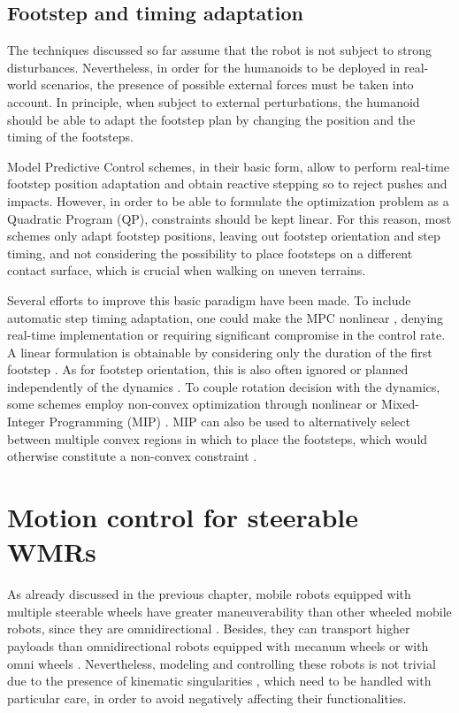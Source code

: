 \subsection{Footstep and timing adaptation}
The techniques discussed so far assume that the robot is not subject to strong 
disturbances. Nevertheless, in order for the humanoids to be deployed in
real-world scenarios, the presence of possible external forces must be taken 
into account. In principle, when subject
to external perturbations, the humanoid should be able to adapt the footstep plan
by changing the position and the timing of the footsteps.

Model Predictive Control schemes, in their basic form, allow to
perform real-time footstep position adaptation \cite{Herdt2010IROS} and obtain
reactive stepping so to reject pushes and impacts. However, in order to be
able to formulate the optimization problem as a Quadratic Program (QP),
constraints should be kept linear. For this reason, most schemes only adapt
footstep positions, leaving out footstep orientation and step timing, and not
considering the possibility to place footsteps on a different contact surface,
which is crucial when walking on uneven terrains.

Several efforts to improve this basic paradigm have been made. To include
automatic step timing adaptation, one could make the MPC nonlinear
\cite{Maximo2020MIQPAutomaticWalking,Bohorquez2017AdaptiveStepDuration,
Caron2017Whentomakeastep,Aurelien2014IROS}, denying real-time implementation or
requiring significant compromise in the control rate. A linear formulation is
obtainable by considering only the duration of the first footstep
\cite{Smaldone2021FeasibilityDrivenSTA,Khadiv2020StepTimingAdaptation}.
As for footstep orientation, this is also often ignored or planned independently
of the dynamics \cite{Herdt2010IROS}. To couple rotation decision with the
dynamics, some schemes employ non-convex optimization through nonlinear
\cite{Naveau2017RAL,Bohorquez2018AdaptiveStepRotation} or Mixed-Integer
Programming (MIP) \cite{Maximo2020MIQPAutomaticWalking}.
MIP can also be used to alternatively select between multiple convex regions
in which to place the footsteps, which would otherwise constitute a
non-convex constraint \cite{Aceituno2018RAL,Deits2014FootstepPlanningMIQCQP}.

\section{Motion control for steerable WMRs}
As already discussed in the previous chapter, mobile robots equipped with
multiple steerable wheels
have greater maneuverability than other wheeled mobile robots, since they are
omnidirectional \cite{RobuffoGiordano2009ICRA}. Besides, they can transport
higher payloads than omnidirectional robots equipped with mecanum wheels
\cite{Dickerson1991ControlOminidirectionalRobotwithMecaumWheels} or
with omni wheels \cite{Blumrich1974OmnidirectionalWheel}.
Nevertheless, modeling and controlling these robots is not
trivial due to the presence of kinematic singularities \cite{Sorour2017RAL},
which need to be handled with particular care, in order to avoid negatively
affecting their functionalities.

